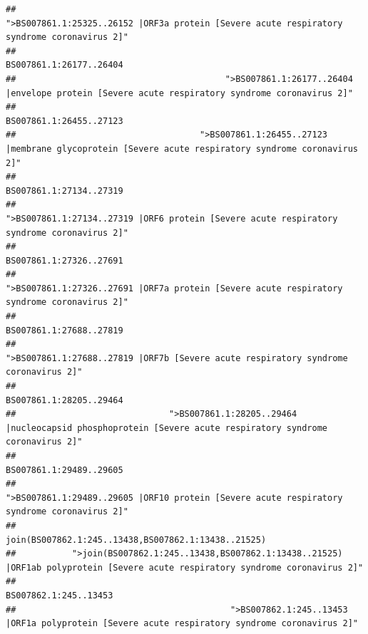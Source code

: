 \documentclass[
]{article}
\begin{document}
\begin{verbatim}
##                                            ">BS007861.1:25325..26152 |ORF3a protein [Severe acute respiratory syndrome coronavirus 2]" 
##                                                                                                                BS007861.1:26177..26404 
##                                         ">BS007861.1:26177..26404 |envelope protein [Severe acute respiratory syndrome coronavirus 2]" 
##                                                                                                                BS007861.1:26455..27123 
##                                    ">BS007861.1:26455..27123 |membrane glycoprotein [Severe acute respiratory syndrome coronavirus 2]" 
##                                                                                                                BS007861.1:27134..27319 
##                                             ">BS007861.1:27134..27319 |ORF6 protein [Severe acute respiratory syndrome coronavirus 2]" 
##                                                                                                                BS007861.1:27326..27691 
##                                            ">BS007861.1:27326..27691 |ORF7a protein [Severe acute respiratory syndrome coronavirus 2]" 
##                                                                                                                BS007861.1:27688..27819 
##                                                    ">BS007861.1:27688..27819 |ORF7b [Severe acute respiratory syndrome coronavirus 2]" 
##                                                                                                                BS007861.1:28205..29464 
##                              ">BS007861.1:28205..29464 |nucleocapsid phosphoprotein [Severe acute respiratory syndrome coronavirus 2]" 
##                                                                                                                BS007861.1:29489..29605 
##                                            ">BS007861.1:29489..29605 |ORF10 protein [Severe acute respiratory syndrome coronavirus 2]" 
##                                                                                    join(BS007862.1:245..13438,BS007862.1:13438..21525) 
##           ">join(BS007862.1:245..13438,BS007862.1:13438..21525) |ORF1ab polyprotein [Severe acute respiratory syndrome coronavirus 2]" 
##                                                                                                                  BS007862.1:245..13453 
##                                          ">BS007862.1:245..13453 |ORF1a polyprotein [Severe acute respiratory syndrome coronavirus 2]" 

\end{verbatim}
\end{document}

